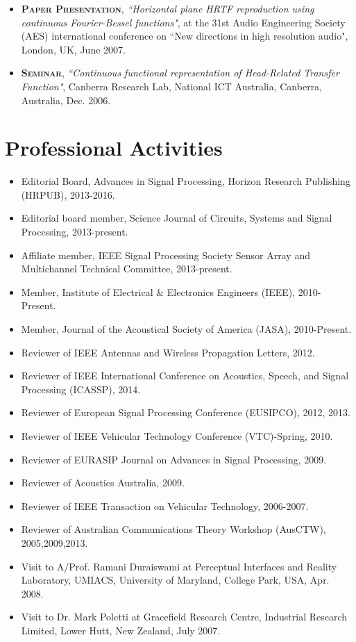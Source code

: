 \documentclass[11pt]{article}
\begin{document}
\begin{itemize}
\item \textsc{\textbf{Paper Presentation}},
\emph{``Horizontal plane HRTF reproduction using continuous Fourier-Bessel functions"}, at the 31st Audio
Engineering Society (AES) international conference on ``New directions in high resolution audio", London, UK,
June 2007.

\item \textsc{\textbf{Seminar}},
\emph{``Continuous functional representation of Head-Related Transfer Function"}, Canberra Research Lab,
National ICT Australia, Canberra, Australia, Dec. 2006.

\end{itemize}

\section*{Professional Activities}
%
\begin{itemize}
%
\item Editorial Board, Advances in Signal Processing, Horizon Research Publishing (HRPUB), 2013-2016.
\item Editorial board member, Science Journal of Circuits, Systems and Signal Processing, 2013-present.
\item Affiliate member, IEEE Signal Processing Society Sensor Array and Multichannel Technical Committee, 2013-present.
\item Member, Institute of Electrical $\&$ Electronics Engineers (IEEE), 2010-Present.
\item Member, Journal of the Acoustical Society of America (JASA), 2010-Present.
\item Reviewer of IEEE Antennas and Wireless Propagation Letters, 2012.
\item Reviewer of IEEE International Conference on Acoustics, Speech, and Signal Processing (ICASSP), 2014.
\item Reviewer of European Signal Processing Conference (EUSIPCO), 2012, 2013.
\item Reviewer of IEEE Vehicular Technology Conference (VTC)-Spring, 2010.
\item Reviewer of EURASIP Journal on Advances in Signal Processing, 2009.
\item Reviewer of Acoustics Australia, 2009.
\item Reviewer of IEEE Transaction on Vehicular Technology, 2006-2007.
\item Reviewer of Australian Communications Theory Workshop (AusCTW), 2005,2009,2013.
\item Visit to A/Prof. Ramani Duraiswami at Perceptual Interfaces and Reality Laboratory, UMIACS,
University of Maryland, College Park, USA, Apr. 2008.
\item Visit to Dr. Mark Poletti at Gracefield Research Centre, Industrial Research Limited, Lower Hutt, New
Zealand, July 2007.
\end{itemize}
\end{document}
